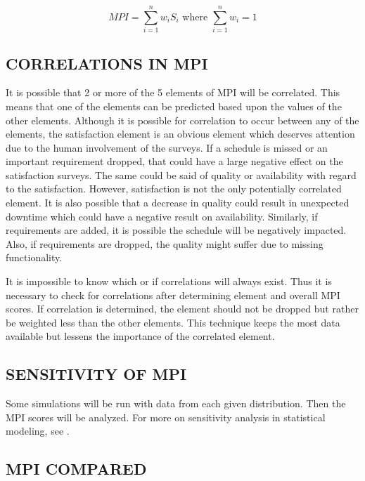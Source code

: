 \documentclass[SDSUThesis.tex]{subfiles}
\begin{document}
            \[
                MPI =\sum\limits^n_{i=1} w_i S_i \text{ where } \sum\limits^n_{i=1} w_i = 1
            \]


    \subsection{CORRELATIONS IN MPI}
        It is possible that 2 or more of the 5 elements of MPI will be correlated.  This means that
        one of the elements can be predicted based upon the values of the other elements.  Although
        it is possible for correlation to occur between any of the elements, the satisfaction element
        is an obvious element which deserves attention due to the human involvement of the surveys. 
        If a schedule is missed or an important requirement dropped, that could have a large negative
        effect on the satisfaction surveys.  The same could be said of quality or availability with regard to 
        the satisfaction.  However, satisfaction is not the only potentially correlated element.  It is also
        possible that a decrease in quality could result in unexpected downtime which could have a
        negative result on availability.  Similarly, if requirements are added, it is possible the schedule
        will be negatively impacted.  Also, if requirements are dropped, the quality might suffer due
        to missing functionality.  
        
        It is impossible to know which or if correlations will always exist.  Thus it is necessary to
        check for correlations after determining element and overall MPI scores.  
        If correlation is determined, the element should not be dropped but rather be weighted less than
        the other elements.  This technique keeps the most data available but lessens the importance of
        the correlated element. 
        
    \subsection{SENSITIVITY OF MPI}
    \label{sub:sensitivity}
        
        Some simulations will be run with data from each given distribution.  Then the MPI scores
        will be analyzed.
        For more on sensitivity analysis in statistical modeling, see \cite{Saltelli2000}.

    \subsection{MPI COMPARED}
    
\end{document}
